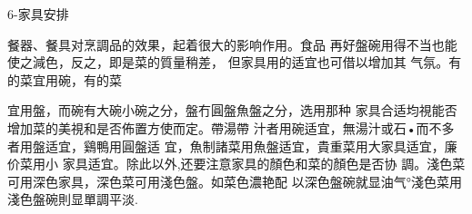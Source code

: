 6-家具安排

餐器、餐具对烹調品的效果，起着很大的影响作用。食品 再好盤碗用得不当也能使之減色，反之，即是菜的質量稍差， 但家具用的适宜也可借以增加其
气氛。有的菜宜用碗，有的菜


宜用盤，而碗有大碗小碗之分，盤冇圓盤魚盤之分，选用那种 家具合适均視能否增加菜的美視和是否佈置方使而定。帶湯帶 汁者用碗适宜，無湯汁或石•而不多者用盤适宜，鷄鴨用圓盤适 宜，魚制諸菜用魚盤适宜，貴重菜用大家具适宜，廉价菜用小 家具适宜。除此以外,还要注意家具的顏色和菜的顏色是否协 調。淺色菜可用深色家具，深色菜可用淺色盤。如菜色濃艳配 以深色盤碗就显油气°淺色菜用淺色盤碗則显單調平淡.
